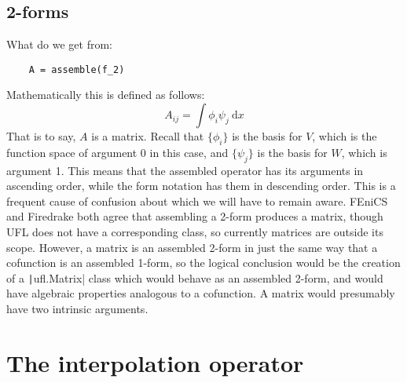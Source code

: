 \documentclass[a4paper,11pt]{article}
\begin{document}
\subsection{2-forms}

What do we get from:
\begin{verbatim}
    A = assemble(f_2)
\end{verbatim}
Mathematically this is defined as follows:
\begin{equation}
    A_{ij} = \int \phi_i \psi_j\ \mathrm{d}x
\end{equation}
That is to say, $A$ is a matrix. Recall that $\{\phi_i\}$ is the basis for $V$, which is the function space of argument 0 in this case, and $\{\psi_j\}$ is the basis for $W$, which is argument 1. This means that the assembled operator has its arguments in ascending order, while the form notation has them in descending order. This is a frequent cause of confusion about which we will have to remain aware. FEniCS and Firedrake both agree that assembling a 2-form produces a matrix, though UFL does not have a corresponding class, so currently matrices are outside its scope. However, a matrix is an assembled 2-form in just the same way that a cofunction is an assembled 1-form, so the logical conclusion would be the creation of a \texttt|ufl.Matrix| class which would behave as an assembled 2-form, and would have algebraic properties analogous to a cofunction. A matrix would presumably have two intrinsic arguments.


\section{The interpolation operator}
\end{document}
